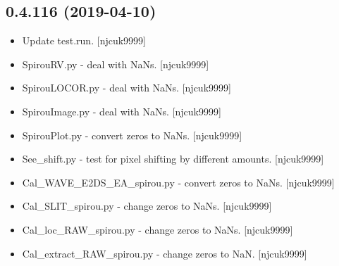 \documentclass[a4paper,10pt,english]{report}
\begin{document}
\subsection{0.4.116 (2019-04-10)}
\label{\detokenize{misc/changelog:id143}}\begin{itemize}
\item {} 
Update test.run. {[}njcuk9999{]}

\item {} 
SpirouRV.py - deal with NaNs. {[}njcuk9999{]}

\item {} 
SpirouLOCOR.py - deal with NaNs. {[}njcuk9999{]}

\item {} 
SpirouImage.py - deal with NaNs. {[}njcuk9999{]}

\item {} 
SpirouPlot.py - convert zeros to NaNs. {[}njcuk9999{]}

\item {} 
See\_shift.py - test for pixel shifting by different amounts.
{[}njcuk9999{]}

\item {} 
Cal\_WAVE\_E2DS\_EA\_spirou.py - convert zeros to NaNs. {[}njcuk9999{]}

\item {} 
Cal\_SLIT\_spirou.py - change zeros to NaNs. {[}njcuk9999{]}

\item {} 
Cal\_loc\_RAW\_spirou.py - change zeros to NaNs. {[}njcuk9999{]}

\item {} 
Cal\_extract\_RAW\_spirou.py - change zeros to NaN. {[}njcuk9999{]}

\end{itemize}
\end{document}
